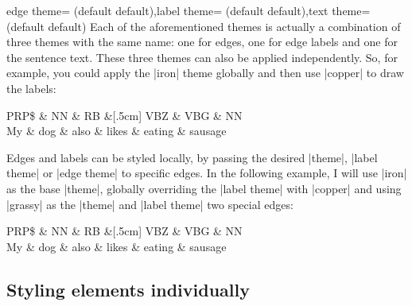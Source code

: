 \documentclass[a4paper]{ltxdoc}
\begin{document}
\begin{keylist}[/depgraph]{edge theme= (default default),label theme= (default default),text theme= (default default)}
   Each of the aforementioned themes is actually a combination of three themes with the same name: one for edges, one for edge labels and one for the sentence text. These three themes can also be applied independently. So, for example, you could apply the |iron| theme globally and then use |copper| to draw the labels:
\begin{codeexample}[]
\begin{dependency}[theme=iron, label theme=copper]
   \begin{deptext}[column sep=.5cm, row sep=.1ex]
      PRP\$ \& NN \& RB \&[.5cm] VBZ \& VBG \& NN \\
      My \& dog \& also \& likes \& eating \& sausage \\
   \end{deptext}
\end{dependency}
\end{codeexample}
\end{keylist}

Edges and labels can be styled locally, by passing the desired |theme|, |label theme| or |edge theme| to specific edges. In the following example, I will use |iron| as the base |theme|, globally overriding the |label theme| with |copper| and using |grassy| as the |theme| and |label theme| two special edges:
\begin{codeexample}[]
\begin{dependency}[theme=iron, label theme=copper]
   \begin{deptext}[column sep=.5cm, row sep=.1ex]
      PRP\$ \& NN \& RB \&[.5cm] VBZ \& VBG \& NN \\
      My \& dog \& also \& likes \& eating \& sausage \\
   \end{deptext}
\end{dependency}
\end{codeexample}

\subsection{Styling elements individually}
\end{document}
